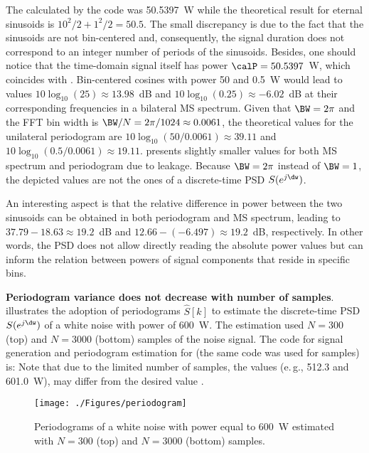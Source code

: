 The  calculated by the code was 50.5397~W while the theoretical result for eternal sinusoids is $10^2/2 + 1^2/2=50.5$. The small discrepancy is due to the fact that the sinusoids are not bin-centered and, consequently, the signal duration does not correspond to an integer number of periods of the sinusoids. Besides, one should notice that the time-domain signal  itself has power $\calP=50.5397$~W, which coincides with .%
Bin-centered cosines with power 50 and 0.5~W would lead to values $10 \log_{10}(25) \approx 13.98$~dB and $10 \log_{10}(0.25) \approx -6.02$~dB at their corresponding frequencies in a bilateral MS spectrum.  Given that $\BW=2 \pi$ and the FFT bin width is $\BW/N=2\pi/1024 \approx 0.0061$, the theoretical values for the unilateral periodogram are $10 \log_{10}(50/0.0061) \approx 39.11$ and $10 \log_{10}(0.5/0.0061) \approx 19.11$.  presents slightly smaller values for both MS spectrum and periodogram due to leakage. Because $\BW=2 \pi$ instead of $\BW=1$, the depicted values are not the ones of a discrete-time PSD $S(e^{j\dw})$.

An interesting aspect is that the relative difference in power between the two sinusoids can be obtained in both periodogram and MS spectrum, leading to $37.79-18.63\approx 19.2$~dB and $12.66-(-6.497)\approx 19.2$~dB, respectively. In other words, the PSD does not allow directly reading the absolute power values but can inform the relation between powers of signal components that reside in specific bins.

\eExample

\bExample \textbf{Periodogram variance does not decrease with number of samples}.
 illustrates the adoption of periodograms $\hat S[k]$ to estimate the discrete-time PSD $S(e^{j\dw})$ of a white noise with power of 600~W. 
The estimation used $N=300$ (top) and $N=3000$ (bottom) samples of the noise signal. The code for signal generation and periodogram estimation for  (the same code was used for  samples) is:
Note that due to the limited number  of samples, the  values (e.\,g., 512.3 and 601.0~W), may differ from the desired value . 

\begin{figure}[htbp]
\centering
\texttt{[image: ./Figures/periodogram]}
\caption{Periodograms of a white noise with power equal to 600~W estimated with $N=300$ (top) and $N=3000$ (bottom) samples.\label{fig:periodogram}}
\end{figure}

